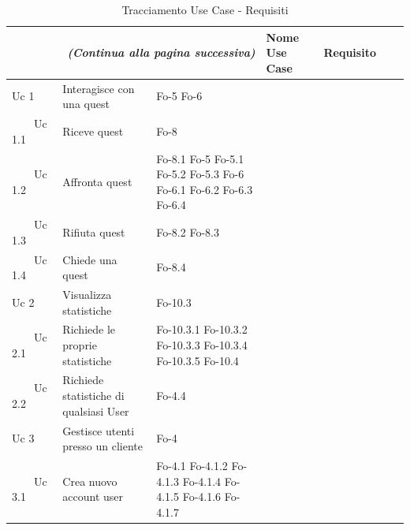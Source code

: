 \documentclass[10pt,a4paper]{article}
\begin{document}
\begin{longtable}{|p{3.5cm}|p{6.5cm}|p{3cm}|}
\caption{Tracciamento Use Case - Requisiti}\\
\hline
\endfirsthead
\multicolumn{3}{r}{\textit{(Continua alla pagina successiva)}}
\endfoot
\multicolumn{3}{l}{\textit{(Continua dalla pagina precedente)}}
\endhead
\hline
\endlastfoot
\textbf{Codice Use Case}& \textbf{Nome Use Case}& \textbf{Requisito}\\
\hline
Uc 1 & Interagisce con una quest & Fo-5 \newline Fo-6\\
\hline
\ \ \ \ Uc 1.1 & Riceve quest & Fo-8 \newline\\
\hline
\ \ \ \ Uc 1.2 & Affronta quest & Fo-8.1 \newline Fo-5 \newline Fo-5.1 \newline Fo-5.2 \newline Fo-5.3 \newline Fo-6 \newline Fo-6.1 \newline Fo-6.2 \newline Fo-6.3 \newline Fo-6.4\\
\hline
\ \ \ \ Uc 1.3 & Rifiuta quest & Fo-8.2 \newline Fo-8.3 \\
\hline
\ \ \ \ Uc 1.4 & Chiede una quest & Fo-8.4\\
\hline
Uc 2 & Visualizza statistiche & Fo-10.3\\
\hline
\ \ \ \ Uc 2.1 & Richiede le proprie statistiche & Fo-10.3.1 \newline Fo-10.3.2 \newline Fo-10.3.3 \newline Fo-10.3.4 \newline Fo-10.3.5 \newline Fo-10.4\\
\hline
\ \ \ \ Uc 2.2 & Richiede statistiche di qualsiasi User & Fo-4.4\\
\hline
Uc 3 & Gestisce utenti presso un cliente & Fo-4\\
\hline
\ \ \ \ Uc 3.1 & Crea nuovo account user & Fo-4.1 \newline Fo-4.1.2 \newline Fo-4.1.3 \newline Fo-4.1.4 \newline Fo-4.1.5 \newline Fo-4.1.6 \newline Fo-4.1.7\\

\end{longtable}
\end{document}

